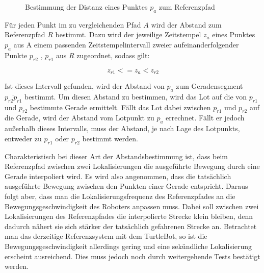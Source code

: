 \begin{figure}[t]
  \begin{center}
  \end{center}
  \caption{Bestimmung der Distanz eines Punktes $p_a$ zum Referenzpfad}
  \label{fig:distancetoref}
\end{figure}

Für jeden Punkt im zu vergleichenden Pfad $A$
wird der Abstand zum Referenzpfad $R$ bestimmt. Dazu wird der jeweilige
Zeitstempel $z_a$ eines Punktes $p_a$ aus A einem passenden
Zeitstempelintervall zweier aufeinanderfolgender Punkte $p_{r2}$ , $p_{r1}$ aus $R$ zugeordnet, sodass
gilt:

\[
z_{r1} <= z_a < z_{r2}
\]

Ist dieses Intervall gefunden, wird der Abstand von $p_a$ zum Geradensegment
$\overline{p_{r2} p_{r1}}$ bestimmt. Um diesen Abstand zu bestimmen, wird das
Lot auf die von $p_{r1}$ und $p_{r2}$ bestimmte Gerade ermittelt. Fällt das Lot
dabei zwischen $p_{r1}$ und $p_{r2}$ auf die Gerade, wird der Abstand vom
Lotpunkt zu $p_a$ errechnet. Fällt er jedoch außerhalb dieses Intervalls, muss
der Abstand, je nach Lage des Lotpunkts, entweder zu $p_{r1}$ oder $p_{r2}$
bestimmt werden. 

Charakteristisch bei dieser Art der Abstandsbestimmung ist, dass beim
Referenzpfad zwischen zwei Lokalisierungen die ausgeführte Bewegung durch eine
Gerade interpoliert wird. 
Es wird also angenommen, dass die tatsächlich
ausgeführte Bewegung zwischen den Punkten einer Gerade entspricht. Daraus
folgt aber, dass man die Lokalisierungsfrequenz des Referenzpfades an die
Bewegungsgeschwindigkeit des Roboters anpassen muss. Dabei soll
zwischen zwei Lokalisierungen des Referenzpfades die interpolierte Strecke
klein bleiben, denn dadurch nähert sie sich stärker der tatsächlich gefahrenen
Strecke an. Betrachtet man das derzeitige Referenzsystem mit dem TurtleBot, so
ist die Bewegungsgeschwindigkeit allerdings gering und eine sekündliche
Lokalisierung erscheint ausreichend. Dies muss jedoch noch durch weitergehende
Tests bestätigt werden.

